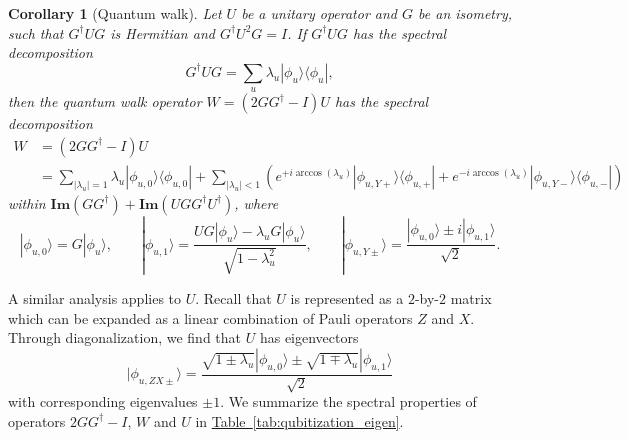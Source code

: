 \documentclass[letterpaper,onecolumn,11pt,accepted=2026-02-14]{quantumarticle}
\newcommand{\abs}[1]{\left\lvert#1\right\rvert}
\newtheorem{corollary}[lemma]{Corollary}
\theoremstyle{remark}
\theoremstyle{plain}
\newcommand{\tab}[1]{\hyperref[tab:#1]{Table~\ref*{tab:#1}}}
\newcommand{\ket}[1]{|#1\rangle}
\newcommand{\bra}[1]{\langle#1|}
\newcommand{\ketbra}[2]{\ket{#1}\!\bra{#2}}
\begin{document}
\begin{corollary}[Quantum walk]
\label{cor:walk}
Let $U$ be a unitary operator and $G$ be an isometry, such that $G^\dagger UG$ is Hermitian and $G^\dagger U^2G=I$.
If $G^\dagger UG$ has the spectral decomposition
\begin{equation}
    G^\dagger UG=\sum_u\lambda_u\ketbra{\phi_u}{\phi_u},
\end{equation}
then the quantum walk operator $W=\left(2GG^\dagger-I\right)U$ has the spectral decomposition
\begin{equation}
\begin{aligned}
    W&=\left(2GG^\dagger-I\right)U\\
    &=\sum_{\abs{\lambda_u}=1}\lambda_u\ketbra{\phi_{u,0}}{\phi_{u,0}}
    +\sum_{\abs{\lambda_u}<1}\left(e^{+ i\arccos(\lambda_u)}\ketbra{\phi_{u,Y+}}{\phi_{u,+}}
    +e^{-i\arccos(\lambda_u)}\ketbra{\phi_{u,Y-}}{\phi_{u,-}}\right)
\end{aligned}
\end{equation}
within $\mathbf{Im}\left(GG^\dagger\right)+\mathbf{Im}\left(UGG^\dagger U^\dagger\right)$, where
\begin{equation}
    \ket{\phi_{u,0}}=G\ket{\phi_u},\qquad
    \ket{\phi_{u,1}}=\frac{UG\ket{\phi_u}-\lambda_uG\ket{\phi_u}}{\sqrt{1-\lambda_u^2}},\qquad
    \ket{\phi_{u,Y\pm}}=\frac{\ket{\phi_{u,0}}\pm i\ket{\phi_{u,1}}}{\sqrt{2}}.
\end{equation}

\end{corollary}

A similar analysis applies to $U$. Recall that $U$ is represented as a $2$-by-$2$ matrix which can be expanded as a linear combination of Pauli operators $Z$ and $X$. Through diagonalization, we find that $U$ has eigenvectors
\begin{equation*}
    \ket{\phi_{u,ZX\pm}}=\frac{\sqrt{1\pm\lambda_u}\ket{\phi_{u,0}}\pm\sqrt{1\mp\lambda_u}\ket{\phi_{u,1}}}{\sqrt{2}}
\end{equation*}
with corresponding eigenvalues $\pm1$. We summarize the spectral properties of operators $2GG^\dagger-I$, $W$ and $U$ in \tab{qubitization_eigen}.
\end{document}
